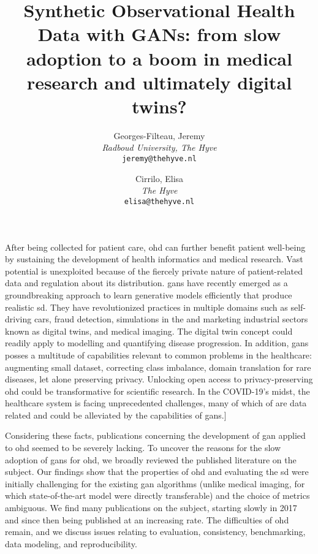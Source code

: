 \documentclass[10pt]{article}
\title{ Synthetic Observational Health Data with GANs: from slow adoption to a boom in medical research and ultimately digital twins?}
\author{
  Georges-Filteau, Jeremy \href{https://orcid.org/0000-0002-0352-6468}{}\\[0.2cm]
  \small \textit{Radboud University, The Hyve}\\
  \small\texttt{jeremy@thehyve.nl}
  \and
  Cirrilo, Elisa \href{https://orcid.org/0000-0002-0241-7833}{}\\[0.2cm]
  \small \textit{The Hyve}\\
  \small\texttt{elisa@thehyve.nl}
}
\renewenvironment{abstract}
 {{\bfseries\noindent{\abstractname}\par\nobreak}\footnotesize}
 {\bigskip}
\begin{document}
    \maketitle
    \vspace{-1em}

    \begingroup
    \let\center\flushleft
    \let\endcenter\endflushleft
    \maketitle
    \endgroup


    \glsresetall
    \begin{abstract}
    After being collected for patient care, \gls{ohd} can further benefit patient well-being by sustaining the development of health informatics and medical research. Vast potential is unexploited because of the fiercely private nature of patient-related data and regulation about its distribution. \glspl{gan} have recently emerged as a groundbreaking approach to  learn generative models efficiently that produce realistic \gls{sd}. They have revolutionized practices in multiple domains such as self-driving cars, fraud detection, simulations in the and marketing industrial sectors known as digital twins, and medical imaging. The digital twin concept could readily apply to modelling and quantifying disease progression. In addition, \glspl{gan} posses a multitude of capabilities relevant to common problems in the healthcare: augmenting small dataset, correcting class imbalance, domain translation for rare diseases, let alone preserving privacy. Unlocking open access to privacy-preserving \gls{ohd} could be transformative for scientific research. In the COVID-19's midst, the healthcare system is facing unprecedented challenges, many of which of are data related and could be alleviated by the capabilities of \glspl{gan}.]\par
    
    Considering these facts, publications concerning the development of  \gls{gan} applied to \gls{ohd} seemed to be severely lacking. To uncover the reasons for the slow adoption of \glspl{gan} for \gls{ohd}, we broadly reviewed the published literature on the subject. Our findings show that the properties of \gls{ohd} and evaluating the \gls{sd} were initially challenging for the existing \gls{gan} algorithms (unlike medical imaging, for which state-of-the-art model were directly transferable) and the choice of metrics ambiguous. We find many publications on the subject, starting slowly in 2017 and since then being published at an increasing rate. The difficulties of \gls{ohd} remain, and we discuss issues relating to evaluation, consistency, benchmarking, data modeling, and reproducibility.
    \end{abstract}

    
    
    
    
    
    

    \pagebreak

    \printglossary[type=oalgo]
    \printglossary[type=\acronymtype]

    \pagebreak

    
\end{document}
